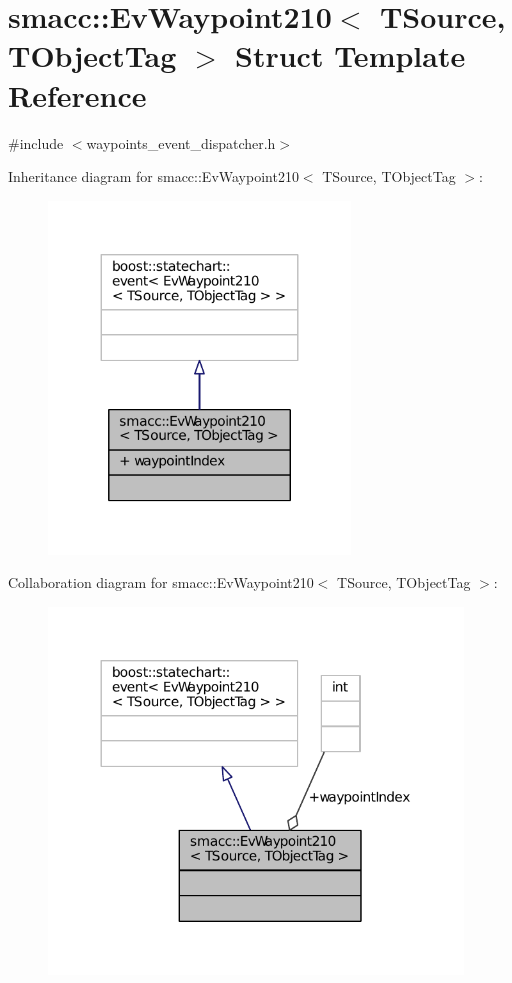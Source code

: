 \hypertarget{structsmacc_1_1EvWaypoint210}{}\section{smacc\+:\+:Ev\+Waypoint210$<$ T\+Source, T\+Object\+Tag $>$ Struct Template Reference}
\label{structsmacc_1_1EvWaypoint210}


{\ttfamily \#include $<$waypoints\+\_\+event\+\_\+dispatcher.\+h$>$}



Inheritance diagram for smacc\+:\+:Ev\+Waypoint210$<$ T\+Source, T\+Object\+Tag $>$\+:
\nopagebreak
\begin{figure}[H]
\begin{center}
\leavevmode
\includegraphics[width=227pt]{structsmacc_1_1EvWaypoint210__inherit__graph}
\end{center}
\end{figure}


Collaboration diagram for smacc\+:\+:Ev\+Waypoint210$<$ T\+Source, T\+Object\+Tag $>$\+:
\nopagebreak
\begin{figure}[H]
\begin{center}
\leavevmode
\includegraphics[width=312pt]{structsmacc_1_1EvWaypoint210__coll__graph}
\end{center}
\end{figure}

